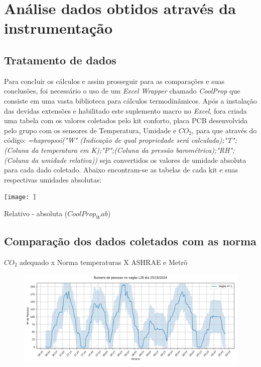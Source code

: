 \documentclass[acronym,symbols,table]{fei}
\begin{document}
\section{Análise dados obtidos através da instrumentação}

\subsection{Tratamento de dados}

Para concluir os cálculos e assim prosseguir para as comparações e suas conclusões, foi necessário o uso de um \textit{Excel Wrapper} chamado \textit{CoolProp} que consiste em uma vasta biblioteca para cálculos termodinâmicos. Após a instalação das devidas extensões e habilitado este suplemento macro no \textit{Excel}, fora criada uma tabela com os valores coletados pelo kit conforto, placa PCB desenvolvida pelo grupo com os sensores de Temperatura, Umidade e $CO_2$, para que através do código:
\textit{=hapropssi("W" (Indicação de qual propriedade será calculada);"T";(Coluna da temperatura em K);"P";(Coluna da pressão barométrica);"RH";(Coluna da umidade relativa))} 
seja convertidos os valores de umidade absoluta para cada dado coletado. 
Abaixo encontram-se as tabelas de cada kit e suas respectivas umidades absolutas:

\begin{table}[!htb] 
 \centering
    \caption{}
    \texttt{[image: ]}
    \label{tab:Req_NBR15220}
\end{table}

Relativo - absoluta ($CoolProp_Wab$)

\subsection{Comparação dos dados coletados com as norma}

${CO}_{2}$ adequado x Norma
temperaturas X ASHRAE e Metrô

\begin{figure}[!htb]
    \centering
    \caption{}
    \includegraphics[width=0.8\linewidth]{Imagens/Numero_de_pessoas_no_vagao_L28_dia_25102024.png}
    \label{fig:}
\end{figure}
\end{document}
